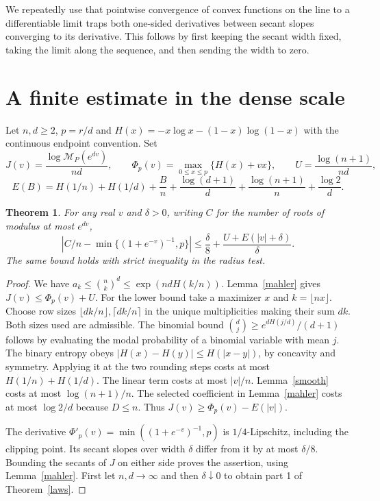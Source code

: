 \documentclass[11pt]{article}
\newtheorem{theorem}{Theorem}
\newcommand{\M}{\mathcal{M}}
\begin{document}
We repeatedly use that pointwise convergence of convex functions on the line to a differentiable limit traps both one-sided derivatives between secant slopes converging to its derivative. This follows by first keeping the secant width fixed, taking the limit along the sequence, and then sending the width to zero.

\section{A finite estimate in the dense scale}
Let $n,d\ge2$, $p=r/d$ and $H(x)=-x\log x-(1-x)\log(1-x)$ with the continuous endpoint convention. Set
\[
 J(v)=\frac{\log\M_P(e^{dv})}{nd},\qquad
 \Phi_p(v)=\max_{0\le x\le p}\{H(x)+vx\},\qquad
 U=\frac{\log(n+1)}{nd},
\]
\[
 E(B)=H(1/n)+H(1/d)+\frac B n+
       \frac{\log(d+1)}d+\frac{\log(n+1)}n+\frac{\log 2}{d}.
\]
\begin{theorem}\label{finite}
For any real $v$ and $\delta>0$, writing $C$ for the number of roots of modulus at most $e^{dv}$,
\[
 \left|C/n-\min\{(1+e^{-v})^{-1},p\}\right|
 \le \frac\delta8+\frac{U+E(|v|+\delta)}\delta .
\]
The same bound holds with strict inequality in the radius test.
\end{theorem}
\begin{proof}
We have $a_k\le\binom nk^d\le\exp(ndH(k/n))$. Lemma~\ref{mahler} gives $J(v)\le\Phi_p(v)+U$. For the lower bound take a maximizer $x$ and $k=\lfloor nx\rfloor$. Choose row sizes $\lfloor dk/n\rfloor,\lceil dk/n\rceil$ in the unique multiplicities making their sum $dk$. Both sizes used are admissible. The binomial bound $\binom dj\ge e^{dH(j/d)}/(d+1)$ follows by evaluating the modal probability of a binomial variable with mean $j$. The binary entropy obeys $|H(x)-H(y)|\le H(|x-y|)$, by concavity and symmetry. Applying it at the two rounding steps costs at most $H(1/n)+H(1/d)$. The linear term costs at most $|v|/n$. Lemma~\ref{smooth} costs at most $\log(n+1)/n$. The selected coefficient in Lemma~\ref{mahler} costs at most $\log 2/d$ because $D\le n$. Thus $J(v)\ge\Phi_p(v)-E(|v|)$.

The derivative $\Phi'_p(v)=\min((1+e^{-v})^{-1},p)$ is $1/4$-Lipschitz, including the clipping point. Its secant slopes over width $\delta$ differ from it by at most $\delta/8$. Bounding the secants of $J$ on either side proves the assertion, using Lemma~\ref{mahler}. First let $n,d\to\infty$ and then $\delta\downarrow0$ to obtain part 1 of Theorem~\ref{laws}.
\end{proof}
\end{document}
